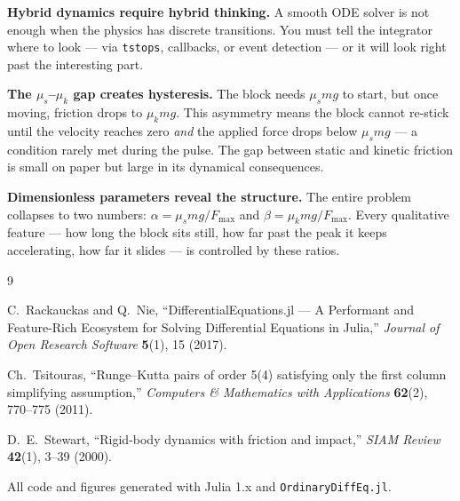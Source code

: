 \documentclass[11pt, a4paper]{article}
\begin{document}
\medskip
\noindent
\textbf{Hybrid dynamics require hybrid thinking.}  A smooth ODE solver
is not enough when the physics has discrete transitions.  You must
tell the integrator where to look --- via \texttt{tstops}, callbacks,
or event detection --- or it will look right past the interesting part.

\medskip
\noindent
\textbf{The $\mu_s$--$\mu_k$ gap creates hysteresis.}  The block needs
$\mu_s mg$ to start, but once moving, friction drops to $\mu_k mg$.
This asymmetry means the block cannot re-stick until the velocity
reaches zero \emph{and} the applied force drops below $\mu_s mg$ ---
a condition rarely met during the pulse.  The gap between static and
kinetic friction is small on paper but large in its dynamical consequences.

\medskip
\noindent
\textbf{Dimensionless parameters reveal the structure.}  The entire
problem collapses to two numbers: $\alpha = \mu_s mg / F_{\max}$
and $\beta = \mu_k mg / F_{\max}$.  Every qualitative feature ---
how long the block sits still, how far past the peak it keeps
accelerating, how far it slides --- is controlled by these ratios.

\vfill

\begin{thebibliography}{9}

C.~Rackauckas and Q.~Nie,
``DifferentialEquations.jl --- A Performant and Feature-Rich Ecosystem
for Solving Differential Equations in Julia,''
\textit{Journal of Open Research Software} \textbf{5}(1), 15 (2017).

Ch.~Tsitouras,
``Runge--Kutta pairs of order 5(4) satisfying only the first column
simplifying assumption,''
\textit{Computers \& Mathematics with Applications} \textbf{62}(2),
770--775 (2011).

D.~E.~Stewart,
``Rigid-body dynamics with friction and impact,''
\textit{SIAM Review} \textbf{42}(1), 3--39 (2000).

\end{thebibliography}

\vspace{12pt}
\begin{center}
    \small\color{codegray}
    All code and figures generated with Julia 1.x and \texttt{OrdinaryDiffEq.jl}.
\end{center}
\end{document}
